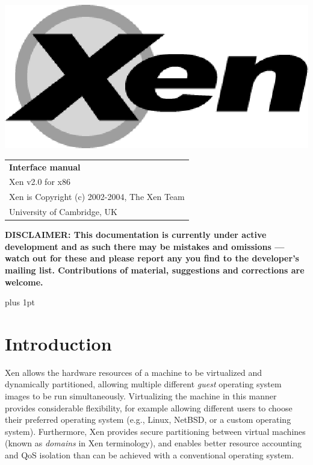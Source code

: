 \documentclass[11pt,twoside,final,openright]{xenstyle}
\begin{document}
\pagestyle{empty}
\begin{center}
\vspace*{\fill}
\includegraphics{figs/xenlogo.eps}
\vfill
\vfill
\vfill
\begin{tabular}{l}
{\Huge \bf Interface manual} \\[4mm]
{\huge Xen v2.0 for x86} \\[80mm]

{\Large Xen is Copyright (c) 2002-2004, The Xen Team} \\[3mm]
{\Large University of Cambridge, UK} \\[20mm]
\end{tabular}
\end{center}

{\bf
DISCLAIMER: This documentation is currently under active development
and as such there may be mistakes and omissions --- watch out for
these and please report any you find to the developer's mailing list.
Contributions of material, suggestions and corrections are welcome.
}

\vfill
\cleardoublepage

\pagestyle{plain}
{ \parskip 0pt plus 1pt
  \tableofcontents }
\cleardoublepage

\raggedbottom
{}
\parindent=0pt
\parskip=5pt
\renewcommand{\topfraction}{.8}
\renewcommand{\bottomfraction}{.8}
\renewcommand{\textfraction}{.2}
\renewcommand{\floatpagefraction}{.8}

\chapter{Introduction}

Xen allows the hardware resources of a machine to be virtualized and
dynamically partitioned, allowing multiple different {\em guest}
operating system images to be run simultaneously.  Virtualizing the
machine in this manner provides considerable flexibility, for example
allowing different users to choose their preferred operating system
(e.g., Linux, NetBSD, or a custom operating system).  Furthermore, Xen
provides secure partitioning between virtual machines (known as
{\em domains} in Xen terminology), and enables better resource
accounting and QoS isolation than can be achieved with a conventional
operating system. 
\end{document}
